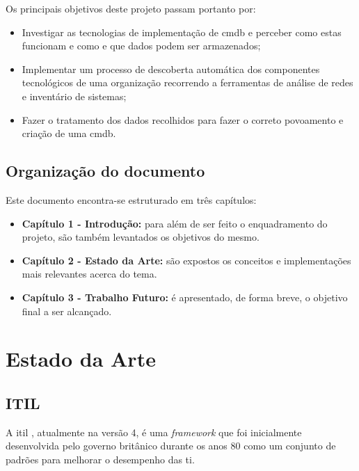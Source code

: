 \documentclass[
  oneside,
  11pt, a4paper,
  footinclude=true,
  headinclude=true,
  cleardoublepage=empty
]{scrbook}
\begin{document}
Os principais objetivos deste projeto passam portanto por:
\begin{itemize}
    \item Investigar as tecnologias de implementação de \gls{cmdb} e perceber como estas funcionam e como e que dados podem ser armazenados;
    \item Implementar um processo de descoberta automática dos componentes tecnológicos de uma organização recorrendo a ferramentas de análise de redes e inventário de sistemas;
    \item Fazer o tratamento dos dados recolhidos para fazer o correto povoamento e criação de uma \gls{cmdb}.
\end{itemize}
	
	\section{Organização do documento}
	
Este documento encontra-se estruturado em três capítulos:

\begin{itemize}
    \item \textbf{Capítulo 1 - Introdução:} para além de ser feito o enquadramento do projeto, são também levantados os objetivos do mesmo.
    
    \item \textbf{Capítulo 2 - Estado da Arte:} são expostos os conceitos e implementações mais relevantes acerca do tema.
    
    \item \textbf{Capítulo 3 - Trabalho Futuro:} é apresentado, de forma breve, o objetivo final a ser alcançado.
\end{itemize}


	\chapter{Estado da Arte}
	\label{cap:estadoarte}

\section{ITIL}

A \gls{itil} \cite{itil4}, atualmente na versão 4, é uma \textit{framework} que foi inicialmente desenvolvida pelo governo britânico durante os anos 80 como um conjunto de padrões para melhorar o desempenho das \gls{ti}.
\end{document}
